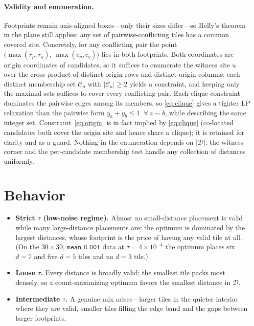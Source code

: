 \documentclass[11pt]{article}
\newcommand{\Dset}{\mathcal{D}}
\begin{document}
\paragraph{Validity and enumeration.}
Footprints remain axis-aligned boxes---only their sizes differ---so Helly's
theorem in the plane still applies: any set of pairwise-conflicting tiles has a
common covered site. Concretely, for any conflicting pair the point
$\bigl(\max(r_p, r_q),\, \max(c_p, c_q)\bigr)$ lies in both footprints. Both
coordinates are origin coordinates of candidates, so it suffices to enumerate the
witness site $u$ over the cross product of distinct origin rows and distinct
origin columns; each distinct membership set $\mathcal{C}_u$ with $|\mathcal{C}_u|
\ge 2$ yields a constraint, and keeping only the maximal sets suffices to cover
every conflicting pair. Each clique constraint dominates the pairwise edges among
its members, so \eqref{eq:clique} gives a tighter LP relaxation than the pairwise
form
$y_a + y_b \le 1 \;\; \forall\, a \sim b$, while describing the same integer set.
Constraint~\eqref{eq:origin} is in fact implied by \eqref{eq:clique} (co-located
candidates both cover the origin site and hence share a clique); it is retained
for clarity and as a guard. Nothing in the enumeration depends on $|\Dset|$: the
witness corner and the per-candidate membership test handle any collection of
distances uniformly.

\section{Behavior}
\begin{itemize}[itemsep=2pt]
  \item \textbf{Strict $\tau$ (low-noise regime).} Almost no small-distance
        placement is valid while many large-distance placements are; the optimum is
        dominated by the largest distances, whose footprint is the price of having
        any valid tile at all. (On the $30\times30$, $\texttt{mean\_0\_001}$ data
        at $\tau = 4\times10^{-4}$ the optimum places six $d=7$ and five $d=5$
        tiles and no $d=3$ tile.)
  \item \textbf{Loose $\tau$.} Every distance is broadly valid; the smallest tile
        packs most densely, so a count-maximizing optimum favors the smallest
        distance in $\Dset$.
  \item \textbf{Intermediate $\tau$.} A genuine mix arises---larger tiles in the
        quieter interior where they are valid, smaller tiles filling the edge band
        and the gaps between larger footprints.
\end{itemize}
\end{document}
